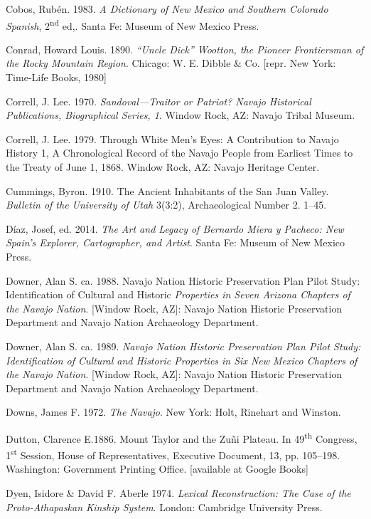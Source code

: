 Cobos, Rubén. 1983.  \textit{A Dictionary of New Mexico and Southern Colorado Spanish}, 2\textsuperscript{nd} ed,.  Santa Fe:  Museum of New Mexico Press.

Conrad, Howard Louis. 1890.  \textit{“Uncle Dick” Wootton, the Pioneer Frontiersman of the Rocky Mountain Region}.  Chicago:  W. E. Dibble \& Co.  [repr. New York:  Time-Life Books, 1980]

Correll, J. Lee. 1970. \textit{Sandoval—Traitor or Patriot?  Navajo Historical Publications, Biographical Series, 1}.  Window Rock, AZ:  Navajo Tribal Museum.

Correll, J. Lee. 1979.  Through White Men’s Eyes: A Contribution to Navajo History 1, A Chronological Record of the Navajo People from Earliest Times to the Treaty of June 1, 1868.  Window Rock, AZ:  Navajo Heritage Center.

Cummings, Byron. 1910.  The Ancient Inhabitants of the San Juan Valley.  \textit{Bulletin of the University of Utah} 3(3:2), Archaeological Number 2. 1--45.

Díaz, Josef, ed. 2014. \textit{The Art and Legacy of Bernardo Miera y Pacheco: New Spain’s Explorer, Cartographer, and Artist}.  Santa Fe:  Museum of New Mexico Press.

Downer, Alan S. ca. 1988.  Navajo Nation Historic Preservation Plan Pilot Study: Identification of Cultural and Historic\textit{ Properties in Seven Arizona Chapters of the Navajo Nation}.  [Window Rock, AZ]:  Navajo Nation Historic Preservation Department and Navajo Nation Archaeology Department.

Downer, Alan S. ca. 1989. \textit{Navajo Nation Historic Preservation Plan Pilot Study: Identification of Cultural and Historic Properties in Six New Mexico Chapters of the Navajo Nation}.  [Window Rock, AZ]:  Navajo Nation Historic Preservation Department and Navajo Nation Archaeology Department.

Downs, James F.  1972.  \textit{The Navajo}.  New York:  Holt, Rinehart and Winston.

Dutton, Clarence E.1886.  Mount Taylor and the Zuñi Plateau.  In 49\textsuperscript{th} Congress, 1\textsuperscript{st} Session, House of Representatives, Executive Document, 13, pp. 105--198.  Washington:  Government Printing Office.  [available at Google Books]

Dyen, Isidore \& David F. Aberle  1974. \textit{Lexical Reconstruction: The Case of the Proto-Athapaskan Kinship System}.  London:  Cambridge University Press.

